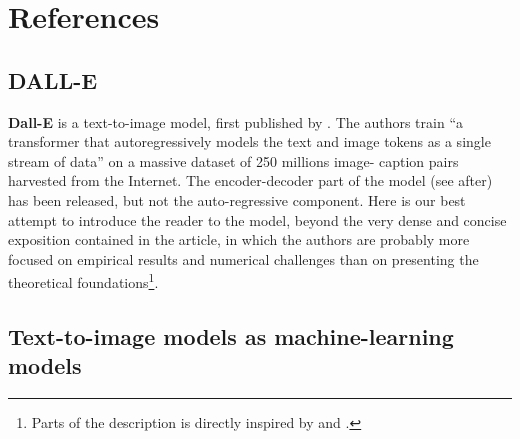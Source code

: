 \documentclass{article}
\begin{document}
\section*{References}


\printbibliography[
    heading = subbibintoc,
    type=article,
    title={Articles scientifiques}]
    
\printbibliography[
    heading = subbibintoc,
    type=online,
    title={Ressources en lignes}]
    
\pagebreak
{}
{}
\begin{appendix}

\section{DALL-E}

\newcommand{\pt}{p_\theta}
\newcommand{\pp}{p_\psi}
\newcommand{\ptp}{p_{\theta,\psi}}
\newcommand{\qp}{q_\phi}
\newcommand{\esp}{\mathbb{E}}
\newcommand{\KL}{D_{\mathrm{KL}}}
\newcommand{\ltppxy}{\mathscr{l}_{\theta,\psi}(x,y)}
\newcommand{\elb}{\underline{\mathscr{l}}}
\newcommand{\elbtppxy}{\underline{\mathscr{l}}_{\theta,\phi,\psi}(x,y)}

\textbf{Dall-E} is a text-to-image model, first published by \citet{zeroshot}.
The authors train \enquote{a transformer that autoregressively models the text and image tokens as a single stream of data} on a massive dataset of 250 millions image- caption pairs harvested from the Internet.
The encoder-decoder part of the model (see after) has been released, but not the auto-regressive component.
Here is our best attempt to introduce the reader to the model, beyond the very dense and concise exposition contained in the article, in which the authors are probably more focused on empirical results and numerical challenges than on presenting the theoretical foundations\footnote{
Parts of the description is directly inspired by \cite{probml-advanced} and \cite{deepgen}.
}.

\subsection{Text-to-image models as machine-learning models}


\end{appendix}
\end{document}
